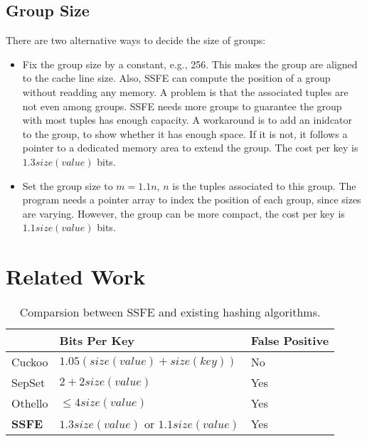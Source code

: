 \documentclass{article}
\begin{document}
\subsection{Group Size}

There are two alternative ways to decide the size of groups:

\begin{itemize}
    \item Fix the group size by a constant, e.g., 256. This makes the group are aligned to the cache line size. Also, SSFE can compute the position of a group without readding any memory. A problem is that the associated tuples are not even among groups. SSFE needs more groups to guarantee the group with most tuples has enough capacity. A workaround is to add an inidcator to the group, to show whether it has enough space. If it is not, it follows a pointer to a dedicated memory area to extend the group. The cost per key is $1.3 size(value)$ bits.
    \item Set the group size to $m = 1.1n$, $n$ is the tuples associated to this group. The program needs a pointer array to index the position of each group, since sizes are varying. However, the group can be more compact, the cost per key is $1.1 size(value)$ bits.
\end{itemize}

\section{Related Work}
\label{sec:related_work}

\begin{table}[]
    \centering
    \begin{tabular}{lll}
        \hline
                  & Bits Per Key                     & False Positive \\ \hline\hline
    Cuckoo\cite{zhou2013scalable}        & $1.05 (size(value) + size(key))$ & No            \\ \hline
    SepSet\cite{zhou2015scaling}        & $2 + 2 size(value)$              & Yes           \\ \hline
    Othello\cite{yu2018memory}       & $\le 4 size(value)$              & Yes           \\ \hline
    \textbf{SSFE} & $1.3 size(value)$  or $1.1 size(value)$ & Yes     
    \\ \hline
    \end{tabular}
    \caption{Comparsion between SSFE and existing hashing algorithms.}
    \label{tab:comparsion}
\end{table}
\end{document}

